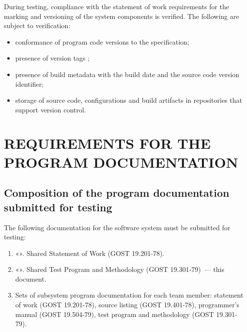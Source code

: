 \documentclass[12pt,a4paper]{extarticle}
\begin{document}
\begin{hseExample}
During testing, compliance with the statement of work requirements for the marking and versioning of the system components is verified. The following are subject to verification:

\begin{itemize}[leftmargin=1.25cm]
    \item conformance of program code versions to the  specification;
    \item presence of version tags ;
    \item presence of build metadata with the build date and the source code version identifier;
    \item storage of source code, configurations and build artifacts in repositories that support version control.
\end{itemize}
\end{hseExample}

\clearpage

\section{REQUIREMENTS FOR THE PROGRAM DOCUMENTATION}

\subsection{Composition of the program documentation submitted for testing}

The following documentation for the software system must be submitted for testing:
\begin{enumerate}[label=\arabic*), leftmargin=1.25cm]
    \item «\projectname». Shared Statement of Work (GOST 19.201-78).
    \item «\projectname». Shared Test Program and Methodology
          (GOST 19.301-79)~--- this document.
    \item Sets of subsystem program documentation for each team member:
          statement of work (GOST 19.201-78), source listing
          (GOST 19.401-78), programmer's manual (GOST 19.504-79),
          test program and methodology (GOST 19.301-79).
\end{enumerate}
\end{document}
